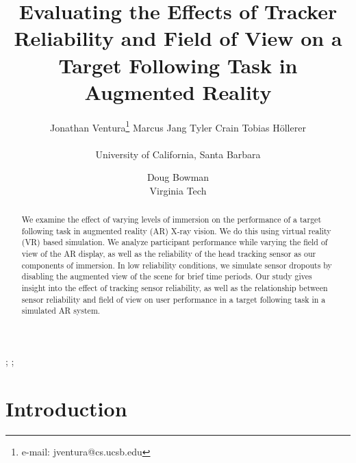 \documentclass{acmsiggraph}                     %
\title{Evaluating the Effects of Tracker Reliability and Field of View on a Target Following Task in Augmented Reality}
\author{
\begin{tabular}{cccc}
Jonathan Ventura\thanks{e-mail: jventura@cs.ucsb.edu}\hspace{12pt}
Marcus Jang\hspace{12pt}
Tyler Crain\hspace{12pt}
Tobias H\"{o}llerer\hspace{12pt}
\end{tabular}\\University of California, Santa Barbara
\and Doug Bowman\\Virginia Tech
}
\begin{document}


\maketitle


\begin{abstract}

We examine the effect of varying levels of immersion on the performance of a target following task in augmented reality (AR) X-ray vision.  We do this using virtual reality (VR) based simulation.  We analyze participant performance while varying the field of view of the AR display, as well as the reliability of the head tracking sensor as our components of immersion.  In low reliability conditions, we simulate sensor dropouts by disabling the augmented view of the scene for brief time periods.  Our study gives insight into the effect of tracking sensor reliability, as well as the relationship between sensor reliability and field of view on user performance in a target following task in a simulated AR system.

\end{abstract}


\begin{CRcatlist}
  ;
  ;
\end{CRcatlist}

\keywordlist

\section{Introduction}

\end{document}
